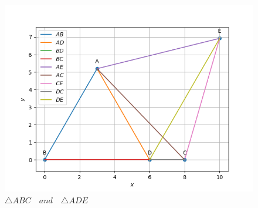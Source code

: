 \begin{enumerate}[label=\thesection.\arabic*,ref=\thesection.\theenumi]
\begin{figure}[H]
    \includegraphics[width=\columnwidth]{figs/Final_python.png}
	\caption{$\triangle ABC \hspace{12pt} and \hspace{12pt} \triangle ADE$}
    \label{fig:Final triangle}
\end{figure}
%
\end{enumerate}
